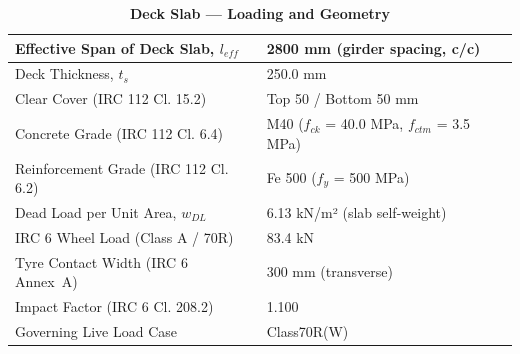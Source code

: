 \documentclass[12pt,a4paper]{report}
\numberwithin{table}{chapter}
\numberwithin{figure}{chapter}
\begin{document}
\vspace{1em}
\begin{longtable}{|L{5.5cm}|p{10.0cm}|}
\caption{\textbf{Deck Slab --- Loading and Geometry}}
\\
\hline
\textnormal{Effective Span of Deck Slab, $l_{eff}$} & 2800 mm (girder spacing, c/c) \\[6pt]
\hline
\textnormal{Deck Thickness, $t_s$} & 250.0 mm \\[6pt]
\hline
\textnormal{Clear Cover (IRC 112 Cl. 15.2)} & Top 50 / Bottom 50 mm \\[6pt]
\hline
\textnormal{Concrete Grade (IRC 112 Cl. 6.4)} & M40 ($f_{ck}$ = 40.0 MPa, $f_{ctm}$ = 3.5 MPa) \\[6pt]
\hline
\textnormal{Reinforcement Grade (IRC 112 Cl. 6.2)} & Fe 500 ($f_y$ = 500 MPa) \\[6pt]
\hline
\textnormal{Dead Load per Unit Area, $w_{DL}$} & 6.13 kN/m² (slab self-weight) \\[6pt]
\hline
\textnormal{IRC 6 Wheel Load (Class A / 70R)} & 83.4 kN \\[6pt]
\hline
\textnormal{Tyre Contact Width (IRC 6 Annex~A)} & 300 mm (transverse) \\[6pt]
\hline
\textnormal{Impact Factor (IRC 6 Cl. 208.2)} & 1.100 \\[6pt]
\hline
\textnormal{Governing Live Load Case} & Class70R(W) \\[6pt]
\hline
\end{longtable}
\end{document}
